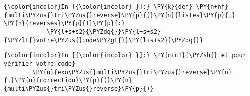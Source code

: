     \begin{Verbatim}[commandchars=\\\{\}]
{\color{incolor}In [{\color{incolor} }]:} \PY{k}{def} \PY{n+nf}{multi\PYZus{}tri\PYZus{}reverse}\PY{p}{(}\PY{n}{listes}\PY{p}{,} \PY{n}{reverses}\PY{p}{)}\PY{p}{:}
            \PY{l+s+s2}{\PYZdq{}}\PY{l+s+s2}{\PYZlt{}votre\PYZus{}code\PYZgt{}}\PY{l+s+s2}{\PYZdq{}}
\end{Verbatim}


    \begin{Verbatim}[commandchars=\\\{\}]
{\color{incolor}In [{\color{incolor} }]:} \PY{c+c1}{\PYZsh{} et pour vérifier votre code}
        \PY{n}{exo\PYZus{}multi\PYZus{}tri\PYZus{}reverse}\PY{o}{.}\PY{n}{correction}\PY{p}{(}\PY{n}{multi\PYZus{}tri\PYZus{}reverse}\PY{p}{)}
\end{Verbatim}